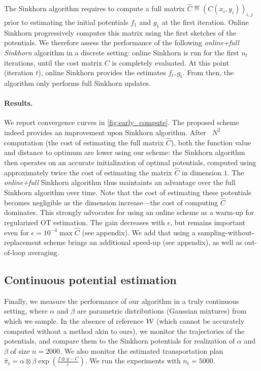 The Sinkhorn algorithm requires to compute a full matrix $\hat C \eqdef (C(x_i,y_i))_{i,j}$ prior to estimating
the initial potentials $f_1$ and $g_1$ at the first iteration. Online Sinkhorn progressively computes this
matrix using the first sketches of the potentials. We therefore assess the
performance of the following \textit{online+full Sinkhorn} algorithm in a
discrete setting: online Sinkhorn is run for the first $n_t$ iterations, until
the cost matrix $C$ is completely evaluated. At this point (iteration $t$),
online Sinkhorn provides the estimates $f_{t}, g_{t}$. From then, the algorithm
only performs full Sinkhorn updates.

\paragraph{Results.} We report convergence curves in
\autoref{fig:early_compute}. The proposed scheme indeed provides an improvement
upon Sinkhorn algorithm. After  $N^2$ computation (the cost of estimating the full matrix $\hat C$),
both the function value and distance to optimum are lower using our scheme: the
Sinkhorn algorithm then operates on an accurate initialization of optimal
potentials, computed using approximately twice the cost of estimating the matrix
$\hat C$ in dimension $1$. The \textit{online+full} Sinkhorn algorithm thus maintaints an
advantage over the full Sinkhorn algorithm over time. Note that the cost of
estimating these potentials becomes negligible as the dimension increase---the
cost of computing $\hat C$ dominates. This strongly advocates for using an online
scheme as a warm-up for regularized OT estimation. The gain decreases with
$\epsilon$, but remains important even for $\epsilon = 10^{-4} \max \hat C$ (see
appendix). We add that using a
sampling-without-replacement scheme brings an additional speed-up (see appendix), as well as out-of-loop averaging.

\subsection{Continuous potential estimation}

Finally, we measure the performance of our algorithm in a truly continuous
setting, where $\alpha$ and $\beta$ are parametric distributions (Gaussian
mixtures) from which we sample. In the absence of reference $\mathcal{W}$ (which cannot be accurately computed
without a method akin to ours), we monitor the
trajectories of the potentials, and compare them to the Sinkhorn potentials for
realization of $\alpha$ and $\beta$ of size $n=2000$. We also monitor the
estimated transportation plan $\hat \pi_t = \alpha \otimes \beta
\exp(\frac{f\oplus g - C}{\varepsilon})$. We run the experiments with
$n_t=5000$.

